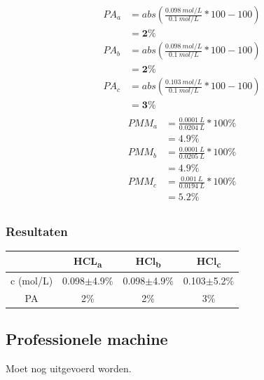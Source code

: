\documentclass[10pt,twoside]{report}
\begin{document}
\begin{multicols}{2}
    \begin{equation*}
        \begin{split}
            PA_a &= abs(\frac{0.098\ mol/L}{0.1\ mol/L}*100-100)\\
                &= \mathbf{2\%} \\
            PA_b &= abs(\frac{0.098\ mol/L}{0.1\ mol/L}*100-100)\\
                &= \mathbf{2\%} \\
            PA_c &= abs(\frac{0.103\ mol/L}{0.1\ mol/L}*100-100)\\
                &= \mathbf{3\%} \\
        \end{split}
    \end{equation*}
\break
    \begin{equation*}
        \begin{split}
            PMM_a &= \frac{0.0001\ L}{0.0204\ L}*100\%\\
                &= \mathbf{4.9\%}\\
            PMM_b &= \frac{0.0001\ L}{0.0205\ L}*100\%\\
                &= \mathbf{4.9\%}\\
            PMM_c &= \frac{0.001\ L}{0.0194\ L}*100\%\\
                &= \mathbf{5.2\%}\\
        \end{split}
    \end{equation*}
\end{multicols}

\subsubsection{Resultaten}
\begin{tabular}{|c|c|c|c|}
    \hline
    & HCL\textsubscript{a} & HCl\textsubscript{b} & HCl\textsubscript{c} \\\hline
    c (mol/L) & 0.098$\pm$4.9\% & 0.098$\pm$4.9\% & 0.103$\pm$5.2\% \\\hline
    PA  & 2\% & 2\% & 3\% \\\hline
\end{tabular}

\newpage

\subsection{Professionele machine}
Moet nog uitgevoerd worden.
\end{document}
